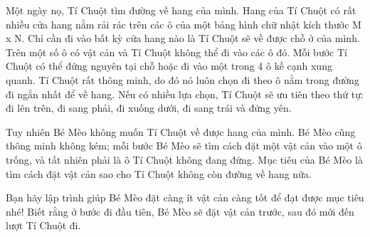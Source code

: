 Một ngày nọ, Tí Chuột tìm đường về hang của mình. Hang của Tí Chuột có rất nhiều cửa hang nằm rải rác trên các ô của một bảng hình chữ nhật kích thước M x N. Chỉ cần đi vào bất kỳ cửa hang nào là Tí Chuột sẽ về được chỗ ở của mình. Trên một số ô có vật cản và Tí Chuột không thể đi vào các ô đó. Mỗi bước Tí Chuột có thể đứng nguyên tại chỗ hoặc đi vào một trong 4 ô kề cạnh xung quanh. Tí Chuột rất thông minh, do đó nó luôn chọn đi theo ô nằm trong đường đi ngắn nhất để về hang. Nếu có nhiều lựa chọn, Tí Chuột sẽ ưu tiên theo thứ tự: đi lên trên, đi sang phải, đi xuống dưới, đi sang trái và đứng yên.

Tuy nhiên Bé Mèo không muốn Tí Chuột về được hang của mình. Bé Mèo cũng thông minh không kém; mỗi bước Bé Mèo sẽ tìm cách đặt một vật cản vào một ô trống, và tất nhiên phải là ô Tí Chuột không đang đứng. Mục tiêu của Bé Mèo là tìm cách đặt vật cản sao cho Tí Chuột không còn đường về hang nữa.

Bạn hãy lập trình giúp Bé Mèo đặt càng ít vật cản càng tốt để đạt được mục tiêu nhé! Biết rằng ở bước đi đầu tiên, Bé Mèo sẽ đặt vật cản trước, sau đó mới đến lượt Tí Chuột đi.